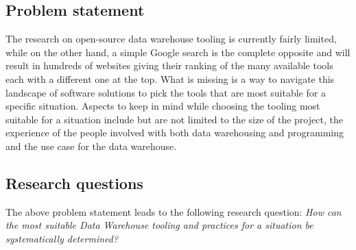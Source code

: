 \documentclass[11pt]{article}
\begin{document}
\subsection{Problem statement}
The research on open-source data warehouse tooling is currently fairly limited, while on the other hand, a simple Google search is the complete opposite and will result in hundreds of websites giving their ranking of the many available tools each with a different one at the top. What is missing is a way to navigate this landscape of software solutions to pick the tools that are most suitable for a specific situation. Aspects to keep in mind while choosing the tooling most suitable for a situation include but are not limited to the size of the project, the experience of the people involved with both data warehousing and programming and the use case for the data warehouse. 

\subsection{Research questions}
The above problem statement leads to the following research question: 
\textit{How can the most suitable Data Warehouse tooling and practices for a situation be systematically determined?}\\
\end{document}
